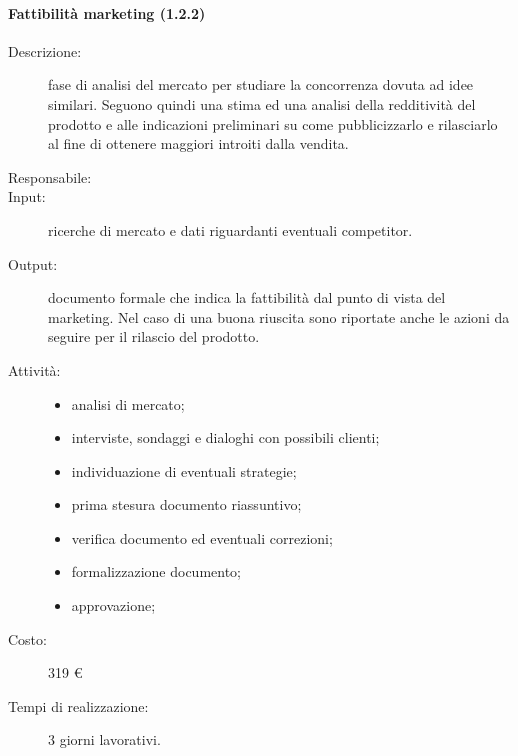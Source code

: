 \paragraph{Fattibilità marketing (1.2.2)}
\begin{description}
\item[Descrizione:] fase di analisi del mercato per studiare la concorrenza dovuta ad idee similari. Seguono quindi una stima ed una analisi della redditività del prodotto e alle indicazioni preliminari su come pubblicizzarlo e rilasciarlo al fine di ottenere maggiori introiti dalla vendita.
\item[Responsabile:] 
\item[Input:] ricerche di mercato e dati riguardanti eventuali competitor.
\item[Output:] documento formale che indica la fattibilità dal punto di vista del marketing. Nel caso di una buona riuscita sono riportate anche le azioni da seguire per il rilascio del prodotto.
\item[Attività:] 
\begin{center}
\begin{itemize}
\item analisi di mercato;
\item interviste, sondaggi e dialoghi con possibili clienti;
\item individuazione di eventuali strategie;
\item prima stesura documento riassuntivo;
\item verifica documento ed eventuali correzioni;
\item formalizzazione documento;
\item approvazione;
\end{itemize}
\end{center}
\item[Costo:] 319 \euro{}
\item[Tempi di realizzazione:] 3 giorni lavorativi.
\end{description}

